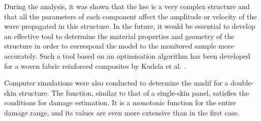 During the analysis, it was shown that the \ac{hsc} is a very complex structure and that all the parameters of each component affect the amplitude or velocity of the wave propagated in this structure.
In the future, it would be essential to develop an effective tool to determine the material properties and geometry of the structure in order to correspond the model to the monitored sample more accurately.
Such a tool based on an optimisation algorithm has been developed for a woven fabric reinforced composites by Kudela et al. \cite{kudela2020elastic}.

Computer simulations were also conducted to determine the \ac{madif} for a double-skin structure.
The function, similar to that of a single-skin panel, satisfies the conditions for damage estimation.
It is a monotonic function for the entire damage range, and its values are even more extensive than in the first case.